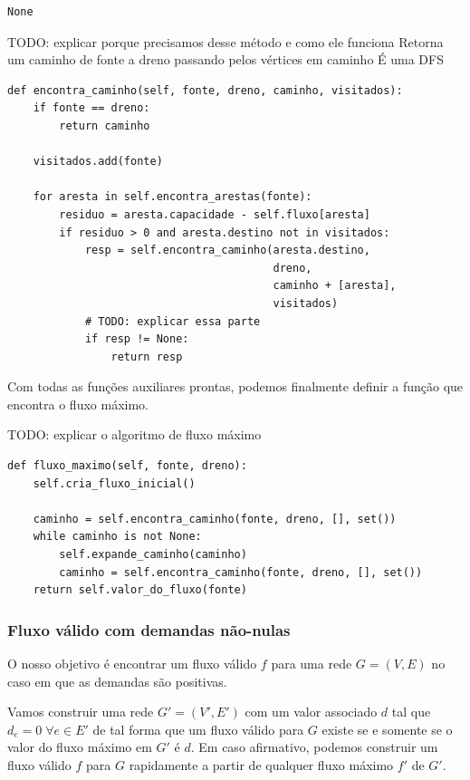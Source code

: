 \documentclass[11pt]{article}
\begin{document}
\begin{verbatim}
None
\end{verbatim}

TODO: explicar porque precisamos desse método e como ele funciona
Retorna um caminho de fonte a dreno passando pelos vértices
em caminho
É uma DFS
\begin{verbatim}
def encontra_caminho(self, fonte, dreno, caminho, visitados):
    if fonte == dreno:
        return caminho

    visitados.add(fonte)

    for aresta in self.encontra_arestas(fonte):
        residuo = aresta.capacidade - self.fluxo[aresta]
        if residuo > 0 and aresta.destino not in visitados:
            resp = self.encontra_caminho(aresta.destino,
                                         dreno,
                                         caminho + [aresta],
                                         visitados)
            # TODO: explicar essa parte
            if resp != None:
                return resp
\end{verbatim}

Com todas as funções auxiliares prontas, podemos finalmente definir a
função que encontra o fluxo máximo.

TODO: explicar o algoritmo de fluxo máximo
\begin{verbatim}
def fluxo_maximo(self, fonte, dreno):
    self.cria_fluxo_inicial()

    caminho = self.encontra_caminho(fonte, dreno, [], set())
    while caminho is not None:
        self.expande_caminho(caminho)
        caminho = self.encontra_caminho(fonte, dreno, [], set())
    return self.valor_do_fluxo(fonte)
\end{verbatim}

\subsubsection{Fluxo válido com demandas não-nulas}
\label{sec-1-4-2}

O nosso objetivo é encontrar um fluxo válido $f$ para uma rede $G =
(V, E)$ no caso em que as demandas são positivas.

Vamos construir uma rede $G' = (V', E')$ com um valor associado $d$
tal que $d_e = 0 \; \forall e \in E'$ de tal forma que um fluxo válido
para $G$ existe se e somente se o valor do fluxo máximo em $G'$ é
$d$. Em caso afirmativo, podemos construir um fluxo válido $f$ para
$G$ rapidamente a partir de qualquer fluxo máximo $f'$ de $G'$.
\end{document}
